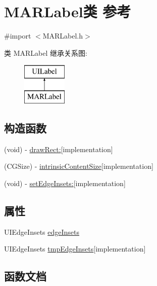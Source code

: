 \hypertarget{interface_m_a_r_label}{}\section{M\+A\+R\+Label类 参考}
\label{interface_m_a_r_label}


{\ttfamily \#import $<$M\+A\+R\+Label.\+h$>$}

类 M\+A\+R\+Label 继承关系图\+:\begin{figure}[H]
\begin{center}
\leavevmode
\includegraphics[height=2.000000cm]{interface_m_a_r_label}
\end{center}
\end{figure}
\subsection*{构造函数}
\begin{DoxyCompactItemize}
\item 
(void) -\/ \hyperlink{interface_m_a_r_label_a9b9c7be57be970bc8613b51591d1f778}{draw\+Rect\+:}{\ttfamily  \mbox{[}implementation\mbox{]}}
\item 
(C\+G\+Size) -\/ \hyperlink{interface_m_a_r_label_aed0229a48be586d2255751e155395219}{intrinsic\+Content\+Size}{\ttfamily  \mbox{[}implementation\mbox{]}}
\item 
(void) -\/ \hyperlink{interface_m_a_r_label_aeca66252c9e731b383499196286a7d03}{set\+Edge\+Insets\+:}{\ttfamily  \mbox{[}implementation\mbox{]}}
\end{DoxyCompactItemize}
\subsection*{属性}
\begin{DoxyCompactItemize}
\item 
U\+I\+Edge\+Insets \hyperlink{interface_m_a_r_label_a3637f3d509eb10387e32a7ab184664b8}{edge\+Insets}
\item 
U\+I\+Edge\+Insets \hyperlink{interface_m_a_r_label_accb0955121fd4e3eb098924b6252185d}{tmp\+Edge\+Insets}{\ttfamily  \mbox{[}implementation\mbox{]}}
\end{DoxyCompactItemize}


\subsection{函数文档}
\mbox{\label{interface_m_a_r_label_a9b9c7be57be970bc8613b51591d1f778}} 
